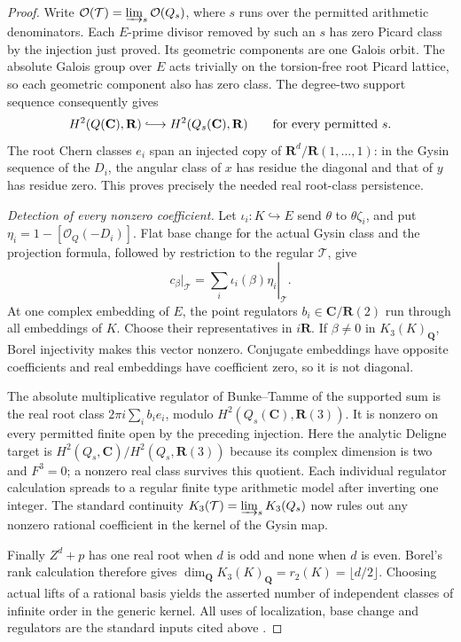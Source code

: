 \documentclass[11pt,a4paper]{amsart}
\numberwithin{equation}{section}
\theoremstyle{definition}
\theoremstyle{remark}
\newcommand{\Q}{\mathbf Q}
\newcommand{\R}{\mathbf R}
\newcommand{\C}{\mathbf C}
\begin{document}
\begin{proof}
Write $\mathcal O(\mathcal T)=\varinjlim_s\mathcal O(Q_s)$,
where $s$ runs over the permitted arithmetic denominators.
Each $E$-prime divisor removed by such an $s$ has zero Picard
class by the injection just proved. Its geometric components
are one Galois orbit. The absolute Galois group over $E$ acts trivially on the torsion-free
root Picard lattice, so each geometric component also has zero
class. The degree-two support sequence consequently gives
\[
 H^2(Q(\C),\R)\lhook\joinrel\longrightarrow
 H^2(Q_s(\C),\R)\qquad\text{for every permitted }s.
\]
The root Chern classes $e_i$ span an injected copy of
$\R^d/\R(1,\ldots,1)$: in the Gysin sequence of the $D_i$,
the angular class of $x$ has residue the diagonal and that of
$y$ has residue zero. This proves precisely the needed real
root-class persistence.

\emph{Detection of every nonzero coefficient.}
Let $\iota_i:K\hookrightarrow E$ send $\theta$ to
$\theta\zeta_i$, and put $\eta_i=1-[\mathcal O_Q(-D_i)]$.
Flat base change for the actual Gysin class and the projection
formula, followed by restriction to the regular $\mathcal T$,
give
\[
 c_\beta|_{\mathcal T}
    =\left.\sum_i\iota_i(\beta)\eta_i\right|_{\mathcal T}.
\]
At one complex embedding of $E$, the point regulators
$b_i\in\C/\R(2)$ run through all embeddings of $K$.
Choose their representatives in $i\R$. If $\beta\ne0$ in
$K_3(K)_{\Q}$, Borel injectivity \cite[Section~6]{BunkeTamme}
makes this vector nonzero.
Conjugate embeddings have opposite coefficients and real
embeddings have coefficient zero, so it is not diagonal.

The absolute multiplicative regulator of Bunke--Tamme
\cite[Theorem~2.31]{BunkeTamme} of the supported sum
is the real root class $2\pi i\sum_i b_i e_i$, modulo
$H^2(Q_s(\C),\R(3))$. It is nonzero on every permitted finite
open by the preceding injection. Here the analytic Deligne
target is $H^2(Q_s,\C)/H^2(Q_s,\R(3))$ because its complex
dimension is two and $F^3=0$; a nonzero real class survives this
quotient. Each individual regulator calculation spreads to a
regular finite type arithmetic model after inverting one
integer. The standard continuity
$K_3(\mathcal T)=\varinjlim_s K_3(Q_s)$ now rules out any
nonzero rational coefficient in the kernel of the Gysin map.

Finally $Z^d+p$ has one real root when $d$ is odd and none
when $d$ is even. Borel's rank calculation
\cite[Proposition~12.2]{Borel} therefore gives
$\dim_{\Q}K_3(K)_{\Q}=r_2(K)=\lfloor d/2\rfloor$.
Choosing actual lifts of a rational basis yields the asserted
number of independent classes of infinite order in the generic kernel.
All uses of localization, base change and regulators are the
standard inputs cited above \cite{Quillen,QuillenFinite,Borel,BunkeTamme,Weibel}.
\end{proof}
\end{document}
